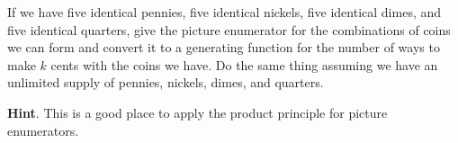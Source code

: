 \documentclass{book}
\begin{document}
\setcounter{cpjt}{316}
\addtocounter{cpjt}{-1}
\begin{activity}\label{change-making}
\hypertarget{p-1562}{}%
If we have five identical pennies, five identical nickels, five identical dimes, and five identical quarters, give the picture enumerator for the combinations of coins we can form and convert it to a generating function for the number of ways to make \(k\) cents with the coins we have. Do the same thing assuming we have an unlimited supply of pennies, nickels, dimes, and quarters.%
\par\smallskip%
\noindent\textbf{Hint}.\hypertarget{hint-204}{}\quad%
\hypertarget{p-1563}{}%
This is a good place to apply the product principle for picture enumerators.%
\par\smallskip%
\noindent\end{activity}

\clearpage
\end{document}

